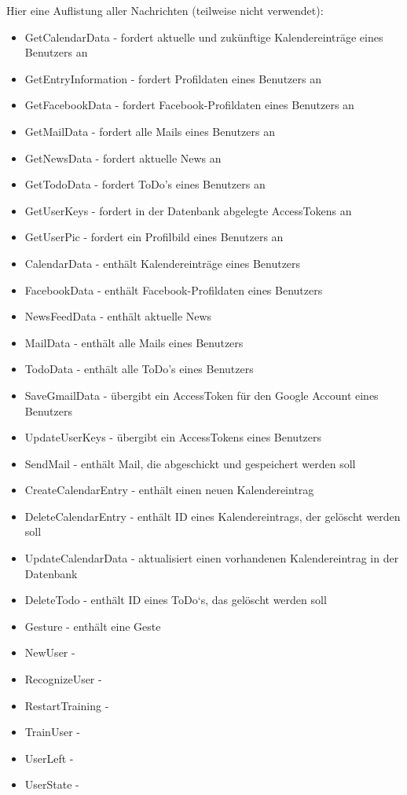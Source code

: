 \documentclass[10pt,a4paper]{report}
\begin{document}
        Hier eine Auflistung aller Nachrichten (teilweise nicht verwendet): 
        \begin{itemize}
        	\item GetCalendarData - fordert aktuelle und zukünftige Kalendereinträge eines Benutzers an
			\item GetEntryInformation - fordert Profildaten eines Benutzers an
			\item GetFacebookData - fordert Facebook-Profildaten eines Benutzers an
			\item GetMailData - fordert alle Mails eines Benutzers an
			\item GetNewsData - fordert aktuelle News an
			\item GetTodoData - fordert ToDo's eines Benutzers an
			\item GetUserKeys - fordert in der Datenbank abgelegte AccessTokens an
			\item GetUserPic -	fordert ein Profilbild eines Benutzers an
			\item CalendarData - enthält Kalendereinträge eines Benutzers
			\item FacebookData - enthält Facebook-Profildaten eines Benutzers
			\item NewsFeedData - enthält aktuelle News
			\item MailData - enthält alle Mails eines Benutzers
			\item TodoData - enthält alle ToDo's eines Benutzers
			\item SaveGmailData - übergibt ein AccessToken für den Google Account eines Benutzers
			\item UpdateUserKeys - übergibt ein AccessTokens eines Benutzers
			\item SendMail - enthält Mail, die abgeschickt und gespeichert werden soll
			\item CreateCalendarEntry - enthält einen neuen Kalendereintrag
			\item DeleteCalendarEntry - enthält ID eines Kalendereintrags, der gelöscht werden soll
			\item UpdateCalendarData - aktualisiert einen vorhandenen Kalendereintrag in der Datenbank
			\item DeleteTodo - enthält ID eines ToDo`s, das gelöscht werden soll
			\item Gesture - enthält eine Geste
			\item NewUser -
			\item RecognizeUser -
			\item RestartTraining -
			\item TrainUser -
			\item UserLeft -
			\item UserState -
        \end{itemize}
\end{document}
